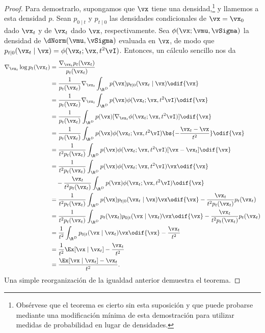 \documentclass[../../book-main.tex]{subfiles}
\begin{document}
\begin{proof}
    Para demostrarlo, supongamos que \(\vx\) tiene una
    densidad,\footnote{Obsérvese que el
        teorema es cierto sin esta suposición y que puede probarse mediante
        una modificación mínima de esta demostración para utilizar medidas de probabilidad
    en lugar de densidades.} y llamemos a esta densidad \(p\). Sean
    \(p_{0 \mid t}\) y \(p_{t \mid 0}\) las densidades condicionales de \(\vx
    = \vx_{0}\) dado \(\vx_{t}\) y de \(\vx_{t}\) dado \(\vx\), respectivamente.
    Sea \(\phi(\vx ; \vmu, \vSigma)\) la densidad de \(\dNorm(\vmu,
    \vSigma)\) evaluada en \(\vx\), de modo que \(p_{t \mid 0}(\vx_{t} \mid \vx)
    = \phi(\vx_{t} ; \vx, t^{2}\vI)\). Entonces, un cálculo sencillo nos da
    \begin{align}
        \nabla_{\vx_{t}} \log p_{t}(\vx_{t})
        &= \frac{\nabla_{\vx_{t}}p_{t}(\vx_{t})}{p_{t}(\vx_{t})} \\
        &=
        \frac{1}{p_{t}(\vx_{t})}\nabla_{\vx_{t}}\int_{\R^{D}}p(\vx)p_{t
        \mid 0}(\vx_{t} \mid \vx)\odif{\vx} \\
        &=
        \frac{1}{p_{t}(\vx_{t})}\nabla_{\vx_{t}}\int_{\R^{D}}p(\vx)\phi(\vx_{t}
        ;\vx, t^{2}\vI)\odif{\vx} \\
        &=
        \frac{1}{p_{t}(\vx_{t})}\int_{\R^{D}}p(\vx)[\nabla_{\vx_{t}}\phi(\vx_{t}
        ;\vx, t^{2}\vI)]\odif{\vx} \\
        &= \frac{1}{p_{t}(\vx_{t})}\int_{\R^{D}}p(\vx)\phi(\vx_{t} ;
        \vx, t^{2}\vI)\bs{-\frac{\vx_{t} - \vx}{t^{2}}}\odif{\vx} \\
        &=
        \frac{1}{t^{2}p_{t}(\vx_{t})}\int_{\R^{D}}p(\vx)\phi(\vx_{t}
        ; \vx, t^{2}\vI)[\vx - \vx_{t}]\odif{\vx} \\
        &= \frac{1}{t^{2}p_{t}(\vx_{t})}\int_{\R^{D}}p(\vx)\phi(\vx_{t} ; \vx,
        t^{2}\vI)\vx \odif{\vx} \\
        & \quad -
        \frac{\vx_{t}}{t^{2}p_{t}(\vx_{t})}\int_{\R^{D}}p(\vx)\phi(\vx_{t}
        ; \vx, t^{2}\vI)\odif{\vx}\nonumber \\
        &= \frac{1}{t^{2}p_{t}(\vx_{t})}\int_{\R^{D}}p(\vx)p_{t \mid
        0}(\vx_{t} \mid \vx)\vx \odif{\vx} -
        \frac{\vx_{t}}{t^{2}p_{t}(\vx_{t})}p_{t}(\vx_{t}) \\
        &=
        \frac{1}{t^{2}p_{t}(\vx_{t})}\int_{\R^{D}}p_{t}(\vx_{t})p_{0
        \mid t}(\vx \mid \vx_{t})\vx \odif{\vx} -
        \frac{\vx_{t}}{t^{2}p_{t}(\vx_{t})}p_{t}(\vx_{t}) \\
        &= \frac{1}{t^{2}}\int_{\R^{D}}p_{0 \mid t}(\vx \mid
        \vx_{t})\vx \odif{\vx} - \frac{\vx_{t}}{t^{2}} \\
        &= \frac{1}{t^{2}}\Ex[\vx \mid \vx_{t}] - \frac{\vx_{t}}{t^{2}} \\
        &= \frac{\Ex[\vx \mid \vx_{t}] - \vx_{t}}{t^{2}}.
    \end{align}
    Una simple reorganización de la igualdad anterior demuestra el teorema.
\end{proof}
\end{document}
